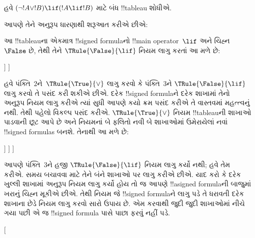 \documentclass[../../../include/open-logic-section]{subfiles}
\begin{document}
\begin{ex}
હવે $(\lnot !A \lor !B) \lif (!A \lif !B)$ માટે બંધ !!{tableau}
શોધીએ.

આપણે તેને અનુરૂપ ધારણાથી શરૂઆત કરીએ છીએ:
\begin{oltableau}
  [\sFmla{\False}{(\lnot \formula{A} \lor \formula{B}) \lif
      (\formula{A} \lif \formula{B})}, just=\TAss]
\end{oltableau}
આ !!{tableau}ના એકમાત્ર !!{signed formula}નો !!{main operator}~$\lif$
અને ચિહ્ન~$\False$ છે, તેથી તેને $\TRule{\False}{\lif}$ નિયમ લાગુ કરતાં
આ મળે છે:
\begin{oltableau}
  [\sFmla{\False}{(\lnot \formula{A} \lor \formula{B})
      \lif (\formula{A} \lif \formula{B})}, just=\TAss, checked
    [\sFmla{\True}{\lnot \formula{A} \lor \formula{B}},
      just={\TRule{\False}{\lif}[1]}
      [\sFmla{\False}{(\formula{A} \lif \formula{B})},
        just={\TRule{\False}{\lif}[1]}
      ]
    ]
  ]
\end{oltableau}
હવે પંક્તિ~$2$ને~$\TRule{\True}{\lor}$ લાગુ કરવો કે પંક્તિ~$3$ને
$\TRule{\False}{\lif}$ લાગુ કરવો તે પસંદ કરી શકીએ છીએ. દરેક
!!{signed formula}ને દરેક શાખામાં તેનો અનુરૂપ નિયમ લાગુ કરીએ ત્યાં સુધી
આપણે કયો ક્રમ પસંદ કરીએ તે વાસ્તવમાં મહત્ત્વનું નથી. તેથી પહેલો વિકલ્પ
પસંદ કરીએ. $\TRule{\True}{\lor}$ નિયમ !!{tableau}ની શાખાઓ પાડવાની છૂટ
આપે છે અને નિયમનાં બે ફલિતો નવી બે શાખાઓમાં ઉમેરાયેલાં નવાં
!!{signed formula}s બનશે. તેનાથી આ મળે છે:
\begin{oltableau}
  [\sFmla{\False}{(\lnot \formula{A} \lor \formula{B}) \lif
      (\formula{A} \lif \formula{B})}, just=\TAss, checked
    [\sFmla{\True}{\lnot \formula{A} \lor \formula{B}},
      just={\TRule{\False}{\lif}[1]}, checked
      [\sFmla{\False}{(\formula{A} \lif \formula{B})},
        just={\TRule{\False}{\lif}[1]}
        [\sFmla{\True}{\lnot \formula{A}}, just={\TRule{\True}{\lor}[2]}]
        [\sFmla{\True}{\formula{B}}, just={\TRule{\True}{\lor}[2]}]
      ]
    ]
  ]
\end{oltableau}
આપણે પંક્તિ~$3$ને હજી $\TRule{\False}{\lif}$ નિયમ લાગુ કર્યો નથી; હવે
તેમ કરીએ. સમય બચાવવા માટે તેને બંને શાખાઓ પર લાગુ કરીએ છીએ. યાદ કરો કે
દરેક ખુલ્લી શાખામાં અનુરૂપ નિયમ લાગુ કર્યો હોય તો જ આપણે
!!a{signed formula}ની બાજુમાં ખરાનું ચિહ્ન મૂકીએ છીએ. તેથી નિયમ જે
!!{signed formula}ને લાગુ પડે તે ધરાવતી દરેક શાખાના છેડે નિયમ લાગુ કરવો
સારો ઉપાય છે. એમ કરવાથી જુદી જુદી શાખાઓમાં નીચે ગયા પછી એ જ
!!{signed formula} પાસે પાછા ફરવું નહીં પડે.
\begin{oltableau}
  [
\end{oltableau}
\end{ex}
\end{document}
